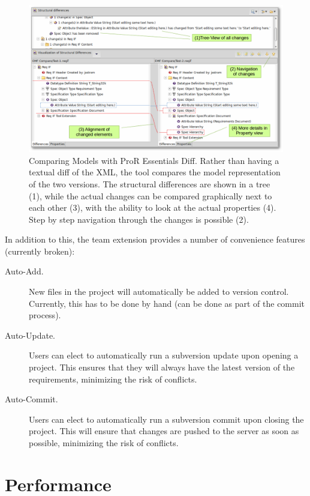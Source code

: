 \documentclass{template/openetcs_report}
\begin{document}
\begin{figure}
	\begin{center}
	\includegraphics[width=.8\textwidth]{img/model-diff.png}
	\end{center}
	\caption[Comparing Models with ProR Essentials Diff.]{Comparing Models with ProR Essentials Diff.  Rather than having a textual diff of the XML, the tool compares the model representation of the two versions.  The structural differences are shown in a tree (1), while the actual changes can be compared graphically next to each other (3), with the ability to look at the actual properties (4).  Step by step navigation through the changes is possible (2).}
	\label{fig:model-diff}
\end{figure}

In addition to this, the team extension provides a number of convenience features (currently broken):

\begin{description}
\item[Auto-Add.] New files in the project will automatically be added to version control.  Currently, this has to be done by hand (can be done as part of the commit process).
\item[Auto-Update.] Users can elect to automatically run a subversion update upon opening a project.  This ensures that they will always have the latest version of the requirements, minimizing the risk of conflicts.
\item[Auto-Commit.] Users can elect to automatically run a subversion commit upon closing the project.  This will ensure that changes are pushed to the server as soon as possible, minimizing the risk of conflicts.
\end{description}

\section{Performance}
\label{sec:performance}
\end{document}
